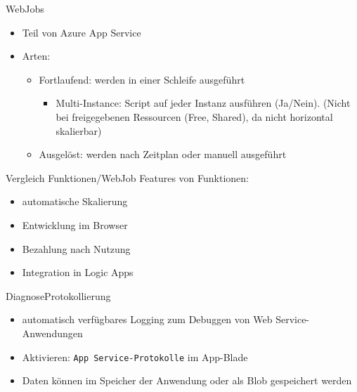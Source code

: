 \begin{flashcard}[Definition]{WebJobs}
    \begin{itemize}
        \item Teil von Azure App Service
        \item Arten:
            \begin{itemize}
                \item Fortlaufend: werden in einer Schleife ausgeführt
                \begin{itemize}
                    \item Multi-Instance: Script auf jeder Instanz ausführen (Ja/Nein).\newline
                        (Nicht bei freigegebenen Ressourcen (Free, Shared), da nicht horizontal skalierbar)
                \end{itemize}
                \item Ausgelöst: werden nach Zeitplan oder manuell ausgeführt
            \end{itemize}
    \end{itemize}
\end{flashcard}

\begin{flashcard}[Definition]{Vergleich Funktionen/WebJob}
    Features von Funktionen:
    \begin{itemize}
        \item automatische Skalierung
        \item Entwicklung im Browser
        \item Bezahlung nach Nutzung
        \item Integration in Logic Apps
    \end{itemize}
\end{flashcard}



\begin{flashcard}[Definition]{DiagnoseProtokollierung}
    \begin{itemize}
        \item automatisch verfügbares Logging zum Debuggen von Web Service-Anwendungen
        \item Aktivieren:\newline
            \texttt{App Service-Protokolle} im App-Blade
        \item Daten können im Speicher der Anwendung oder als Blob gespeichert werden
    \end{itemize}
\end{flashcard}

